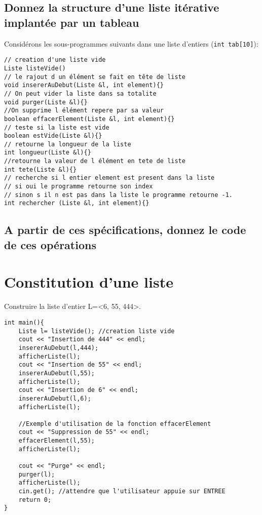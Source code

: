 \documentclass[french]{article}
\begin{document}
	\subsection{Donnez la structure d’une liste itérative implantée par un tableau}
	Considérons les sous-programmes suivants dans une liste d’entiers (\texttt{int tab[10]}):
\begin{lstlisting}[caption={Liste des opérations dans une liste d’entiers}]
// creation d'une liste vide 
Liste listeVide()
// le rajout d un élément se fait en tête de liste
void insererAuDebut(Liste &l, int element){} 
// On peut vider la liste dans sa totalite
void purger(Liste &l){} 
//On supprime l élément repere par sa valeur
boolean effacerElement(Liste &l, int element){}
// teste si la liste est vide
boolean estVide(Liste &l){} 
// retourne la longueur de la liste
int longueur(Liste &l){}
//retourne la valeur de l élément en tete de liste
int tete(Liste &l){}
// recherche si l entier element est present dans la liste 
// si oui le programme retourne son index 
// sinon s il n est pas dans la liste le programme retourne -1.
int rechercher (Liste &l, int element){}  
\end{lstlisting}
	
	
	\subsection{A partir de ces spécifications, donnez le code de ces opérations}

	\section{Constitution d’une liste}
	Construire la liste d’entier L=<6, 55, 444>.
	
	\begin{lstlisting}
int main(){
    Liste l= listeVide(); //creation liste vide
    cout << "Insertion de 444" << endl;
    insererAuDebut(l,444);
    afficherListe(l);
    cout << "Insertion de 55" << endl;
    insererAuDebut(l,55);
    afficherListe(l);
    cout << "Insertion de 6" << endl;
    insererAuDebut(l,6);
    afficherListe(l);
	
    //Exemple d'utilisation de la fonction effacerElement
    cout << "Suppression de 55" << endl;
    effacerElement(l,55);
    afficherListe(l);
    
    cout << "Purge" << endl;
    purger(l);
    afficherListe(l);
    cin.get(); //attendre que l'utilisateur appuie sur ENTREE
    return 0;	 
}
	\end{lstlisting}
\end{document}
